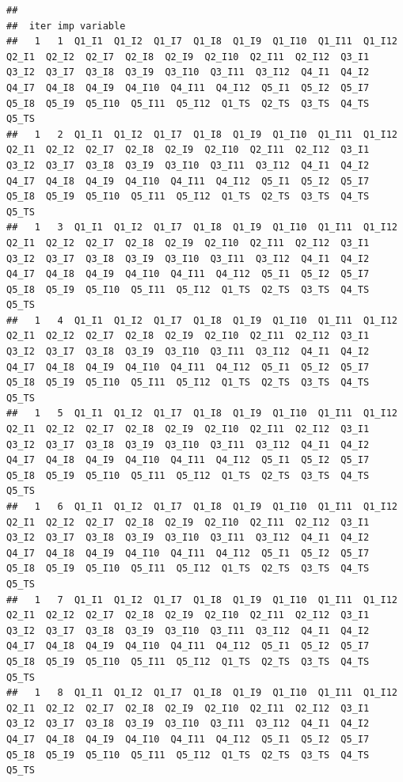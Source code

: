 \documentclass[
]{book}
\begin{document}
\begin{verbatim}
## 
##  iter imp variable
##   1   1  Q1_I1  Q1_I2  Q1_I7  Q1_I8  Q1_I9  Q1_I10  Q1_I11  Q1_I12  Q2_I1  Q2_I2  Q2_I7  Q2_I8  Q2_I9  Q2_I10  Q2_I11  Q2_I12  Q3_I1  Q3_I2  Q3_I7  Q3_I8  Q3_I9  Q3_I10  Q3_I11  Q3_I12  Q4_I1  Q4_I2  Q4_I7  Q4_I8  Q4_I9  Q4_I10  Q4_I11  Q4_I12  Q5_I1  Q5_I2  Q5_I7  Q5_I8  Q5_I9  Q5_I10  Q5_I11  Q5_I12  Q1_TS  Q2_TS  Q3_TS  Q4_TS  Q5_TS
##   1   2  Q1_I1  Q1_I2  Q1_I7  Q1_I8  Q1_I9  Q1_I10  Q1_I11  Q1_I12  Q2_I1  Q2_I2  Q2_I7  Q2_I8  Q2_I9  Q2_I10  Q2_I11  Q2_I12  Q3_I1  Q3_I2  Q3_I7  Q3_I8  Q3_I9  Q3_I10  Q3_I11  Q3_I12  Q4_I1  Q4_I2  Q4_I7  Q4_I8  Q4_I9  Q4_I10  Q4_I11  Q4_I12  Q5_I1  Q5_I2  Q5_I7  Q5_I8  Q5_I9  Q5_I10  Q5_I11  Q5_I12  Q1_TS  Q2_TS  Q3_TS  Q4_TS  Q5_TS
##   1   3  Q1_I1  Q1_I2  Q1_I7  Q1_I8  Q1_I9  Q1_I10  Q1_I11  Q1_I12  Q2_I1  Q2_I2  Q2_I7  Q2_I8  Q2_I9  Q2_I10  Q2_I11  Q2_I12  Q3_I1  Q3_I2  Q3_I7  Q3_I8  Q3_I9  Q3_I10  Q3_I11  Q3_I12  Q4_I1  Q4_I2  Q4_I7  Q4_I8  Q4_I9  Q4_I10  Q4_I11  Q4_I12  Q5_I1  Q5_I2  Q5_I7  Q5_I8  Q5_I9  Q5_I10  Q5_I11  Q5_I12  Q1_TS  Q2_TS  Q3_TS  Q4_TS  Q5_TS
##   1   4  Q1_I1  Q1_I2  Q1_I7  Q1_I8  Q1_I9  Q1_I10  Q1_I11  Q1_I12  Q2_I1  Q2_I2  Q2_I7  Q2_I8  Q2_I9  Q2_I10  Q2_I11  Q2_I12  Q3_I1  Q3_I2  Q3_I7  Q3_I8  Q3_I9  Q3_I10  Q3_I11  Q3_I12  Q4_I1  Q4_I2  Q4_I7  Q4_I8  Q4_I9  Q4_I10  Q4_I11  Q4_I12  Q5_I1  Q5_I2  Q5_I7  Q5_I8  Q5_I9  Q5_I10  Q5_I11  Q5_I12  Q1_TS  Q2_TS  Q3_TS  Q4_TS  Q5_TS
##   1   5  Q1_I1  Q1_I2  Q1_I7  Q1_I8  Q1_I9  Q1_I10  Q1_I11  Q1_I12  Q2_I1  Q2_I2  Q2_I7  Q2_I8  Q2_I9  Q2_I10  Q2_I11  Q2_I12  Q3_I1  Q3_I2  Q3_I7  Q3_I8  Q3_I9  Q3_I10  Q3_I11  Q3_I12  Q4_I1  Q4_I2  Q4_I7  Q4_I8  Q4_I9  Q4_I10  Q4_I11  Q4_I12  Q5_I1  Q5_I2  Q5_I7  Q5_I8  Q5_I9  Q5_I10  Q5_I11  Q5_I12  Q1_TS  Q2_TS  Q3_TS  Q4_TS  Q5_TS
##   1   6  Q1_I1  Q1_I2  Q1_I7  Q1_I8  Q1_I9  Q1_I10  Q1_I11  Q1_I12  Q2_I1  Q2_I2  Q2_I7  Q2_I8  Q2_I9  Q2_I10  Q2_I11  Q2_I12  Q3_I1  Q3_I2  Q3_I7  Q3_I8  Q3_I9  Q3_I10  Q3_I11  Q3_I12  Q4_I1  Q4_I2  Q4_I7  Q4_I8  Q4_I9  Q4_I10  Q4_I11  Q4_I12  Q5_I1  Q5_I2  Q5_I7  Q5_I8  Q5_I9  Q5_I10  Q5_I11  Q5_I12  Q1_TS  Q2_TS  Q3_TS  Q4_TS  Q5_TS
##   1   7  Q1_I1  Q1_I2  Q1_I7  Q1_I8  Q1_I9  Q1_I10  Q1_I11  Q1_I12  Q2_I1  Q2_I2  Q2_I7  Q2_I8  Q2_I9  Q2_I10  Q2_I11  Q2_I12  Q3_I1  Q3_I2  Q3_I7  Q3_I8  Q3_I9  Q3_I10  Q3_I11  Q3_I12  Q4_I1  Q4_I2  Q4_I7  Q4_I8  Q4_I9  Q4_I10  Q4_I11  Q4_I12  Q5_I1  Q5_I2  Q5_I7  Q5_I8  Q5_I9  Q5_I10  Q5_I11  Q5_I12  Q1_TS  Q2_TS  Q3_TS  Q4_TS  Q5_TS
##   1   8  Q1_I1  Q1_I2  Q1_I7  Q1_I8  Q1_I9  Q1_I10  Q1_I11  Q1_I12  Q2_I1  Q2_I2  Q2_I7  Q2_I8  Q2_I9  Q2_I10  Q2_I11  Q2_I12  Q3_I1  Q3_I2  Q3_I7  Q3_I8  Q3_I9  Q3_I10  Q3_I11  Q3_I12  Q4_I1  Q4_I2  Q4_I7  Q4_I8  Q4_I9  Q4_I10  Q4_I11  Q4_I12  Q5_I1  Q5_I2  Q5_I7  Q5_I8  Q5_I9  Q5_I10  Q5_I11  Q5_I12  Q1_TS  Q2_TS  Q3_TS  Q4_TS  Q5_TS

\end{verbatim}
\end{document}
